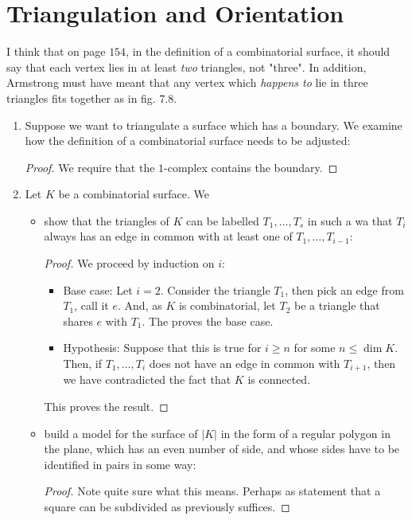 \documentclass{book}
\begin{document}
\section{Triangulation and Orientation}
I think that on page $154$, in the definition of a combinatorial surface, it should say that each vertex lies in at least \textit{two} triangles, not "three". In addition, Armstrong must have meant that any vertex which \textit{happens to} lie in three triangles fits together as in fig. $7.8$. 
\begin{enumerate}[(1)]
    \item Suppose we want to triangulate a surface which has a boundary. We examine how the definition of a combinatorial surface needs to be adjusted: 
        \begin{proof} We require that the $1$-complex contains the boundary. 
        \end{proof}

    \item Let $K$ be a combinatorial surface. We  
        \begin{itemize}
            \item show that the triangles of $K$ can be labelled $T_1, \dots, T_s$ in such a wa that $T_i$ always has an edge in common with at least one of $T_1, \dots, T_{i-1}$: 
                \begin{proof} We proceed by induction on $i$: 
                    \begin{itemize}
                        \item Base case: Let $i = 2$. Consider the triangle $T_1$, then pick an edge from $T_1$, call it $e$. And, as $K$ is combinatorial, let $T_2$ be a triangle that shares $e$ with $T_1$. The proves the base case.

                        \item Hypothesis: Suppose that this is true for $i \geq n$ for some $n \leq \dim K$. Then, if $T_1, \dots, T_i$ does not have an edge in common with $T_{i+1}$, then we have contradicted the fact that $K$ is connected.
                    \end{itemize}
                    This proves the result. 
                \end{proof}

            \item build a model for the surface of $|K|$ in the form of a regular polygon in the plane, which has an even number of side, and whose sides have to be identified in pairs in some way: 
                \begin{proof} Note quite sure what this means. Perhaps as statement that a square can be subdivided as previously suffices. 
                \end{proof}
        \end{itemize}


\end{enumerate}
\end{document}
